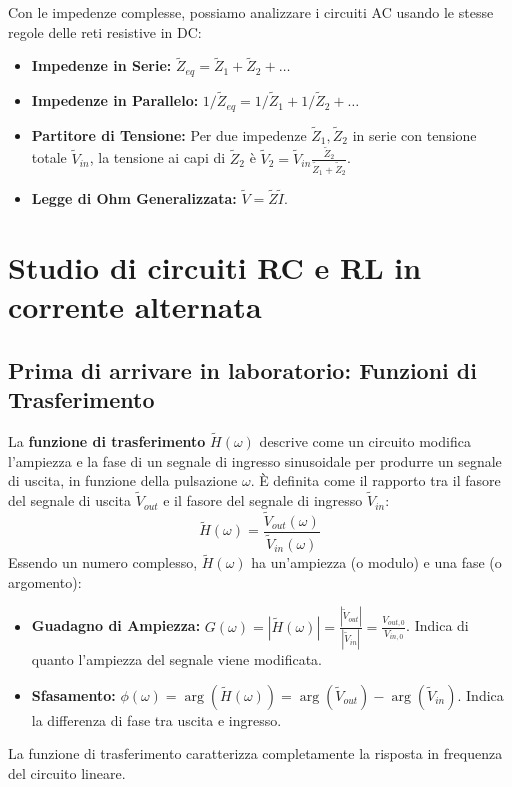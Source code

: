 \documentclass[a4paper, 11pt]{article}
\newcommand{\abs}[1]{\left|#1\right|}
\newcommand{\argum}[1]{\arg\left(#1\right)}
\begin{document}
Con le impedenze complesse, possiamo analizzare i circuiti AC usando le stesse regole delle reti resistive in DC:
\begin{itemize}
    \item \textbf{Impedenze in Serie:} $\tilde{Z}_{eq} = \tilde{Z}_1 + \tilde{Z}_2 + \dots$
    \item \textbf{Impedenze in Parallelo:} $1/\tilde{Z}_{eq} = 1/\tilde{Z}_1 + 1/\tilde{Z}_2 + \dots$
    \item \textbf{Partitore di Tensione:} Per due impedenze $\tilde{Z}_1, \tilde{Z}_2$ in serie con tensione totale $\tilde{V}_{in}$, la tensione ai capi di $\tilde{Z}_2$ è $\tilde{V}_2 = \tilde{V}_{in} \frac{\tilde{Z}_2}{\tilde{Z}_1 + \tilde{Z}_2}$.
    \item \textbf{Legge di Ohm Generalizzata:} $\tilde{V} = \tilde{Z} \tilde{I}$.
\end{itemize}

\section{Studio di circuiti RC e RL in corrente alternata}

\subsection{Prima di arrivare in laboratorio: Funzioni di Trasferimento}

La \textbf{funzione di trasferimento} $\tilde{H}(\omega)$ descrive come un circuito modifica l'ampiezza e la fase di un segnale di ingresso sinusoidale per produrre un segnale di uscita, in funzione della pulsazione $\omega$. È definita come il rapporto tra il fasore del segnale di uscita $\tilde{V}_{out}$ e il fasore del segnale di ingresso $\tilde{V}_{in}$:
\begin{equation}
    \tilde{H}(\omega) = \frac{\tilde{V}_{out}(\omega)}{\tilde{V}_{in}(\omega)}
\end{equation}
Essendo un numero complesso, $\tilde{H}(\omega)$ ha un'ampiezza (o modulo) e una fase (o argomento):
\begin{itemize}
    \item \textbf{Guadagno di Ampiezza:} $G(\omega) = \abs{\tilde{H}(\omega)} = \frac{\abs{\tilde{V}_{out}}}{\abs{\tilde{V}_{in}}} = \frac{V_{out,0}}{V_{in,0}}$. Indica di quanto l'ampiezza del segnale viene modificata.
    \item \textbf{Sfasamento:} $\phi(\omega) = \argum{\tilde{H}(\omega)} = \argum{\tilde{V}_{out}} - \argum{\tilde{V}_{in}}$. Indica la differenza di fase tra uscita e ingresso.
\end{itemize}
La funzione di trasferimento caratterizza completamente la risposta in frequenza del circuito lineare.
\end{document}

